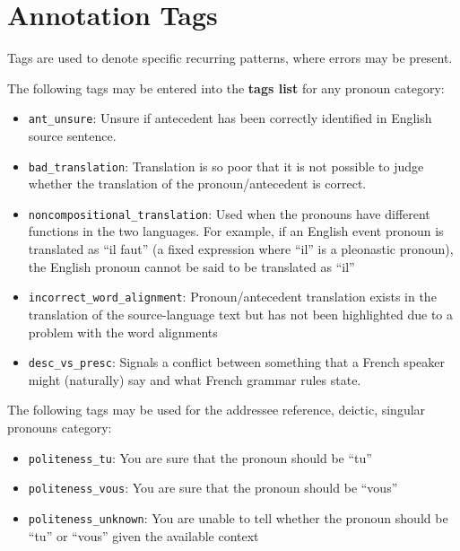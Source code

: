 \documentclass[11pt]{article} %
\newcommand\tag[1]{\texttt{#1}}
\begin{document}
\section{Annotation Tags}
\label{Tags}
Tags are used to denote specific recurring patterns, where errors may be present.

The following tags may be entered into the \textbf{tags list} for any pronoun category:

\begin{itemize}
  \item \tag{ant\_unsure}: Unsure if antecedent has been correctly identified in English source sentence.
  \item \tag{bad\_translation}: Translation is so poor that it is not possible to judge whether the translation of the pronoun/antecedent is correct.
  \item \tag{noncompositional\_translation}: Used when the pronouns have different functions in the two languages. For example, if an English event pronoun is translated as ``il faut'' (a fixed expression where ``il'' is a pleonastic pronoun), the English pronoun cannot be said to be translated as ``il''
  \item \tag{incorrect\_word\_alignment}: Pronoun/antecedent translation exists in the translation of the source-language text but has not been highlighted due to a problem with the word alignments
  \item \tag{desc\_vs\_presc}: Signals a conflict between something that a French speaker might (naturally) say and what French grammar rules state.
\end{itemize}  

The following tags may be used for the addressee reference, deictic, singular pronouns category:

\begin{itemize}  
  \item \tag{politeness\_tu}: You are sure that the pronoun should be ``tu''
  \item \tag{politeness\_vous}: You are sure that the pronoun should be ``vous''
  \item \tag{politeness\_unknown}: You are unable to tell whether the pronoun should be ``tu'' or ``vous'' given the available context
\end{itemize}
\end{document}
